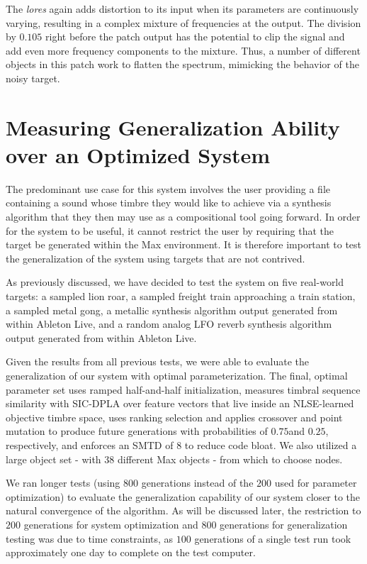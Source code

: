 \documentclass[12pt]{report} 	%
\numberwithin{figure}{chapter}
\numberwithin{table}{chapter}
\numberwithin{equation}{chapter}
\begin{document}
\begin{flushleft}
The \textit{lores\texttildelow{}} again adds distortion to its input when its parameters are continuously varying, resulting in a complex mixture of frequencies at the output. The division by $0.105$ right before the patch output has the potential to clip the signal and add even more frequency components to the mixture. Thus, a number of different objects in this patch work to flatten the spectrum, mimicking the behavior of the noisy target.

\clearpage
\section{Measuring Generalization Ability over an Optimized System}

The predominant use case for this system involves the user providing a file containing a sound whose timbre they would like to achieve via a synthesis algorithm that they then may use as a compositional tool going forward. In order for the system to be useful, it cannot restrict the user by requiring that the target be generated within the Max environment. It is therefore important to test the generalization of the system using targets that are not contrived.

As previously discussed, we have decided to test the system on five real-world targets: a sampled lion roar, a sampled freight train approaching a train station, a sampled metal gong, a metallic synthesis algorithm output generated from within Ableton Live, and a random analog LFO reverb synthesis algorithm output generated from within Ableton Live.

Given the results from all previous tests, we were able to evaluate the generalization of our system with optimal parameterization. The final, optimal parameter set uses ramped half-and-half initialization, measures timbral sequence similarity with SIC-DPLA over feature vectors that live inside an NLSE-learned objective timbre space, uses ranking selection and applies crossover and point mutation to produce future generations with probabilities of $0.75$and $0.25$, respectively, and enforces an SMTD of $8$ to reduce code bloat. We also utilized a large object set - with $38$ different Max objects - from which to choose nodes.

We ran longer tests (using $800$ generations instead of the $200$ used for parameter optimization) to evaluate the generalization capability of our system closer to the natural convergence of the algorithm. As will be discussed later, the restriction to $200$ generations for system optimization and $800$ generations for generalization testing was due to time constraints, as $100$ generations of a single test run took approximately one day to complete on the test computer. 


\end{flushleft}
\end{document}
